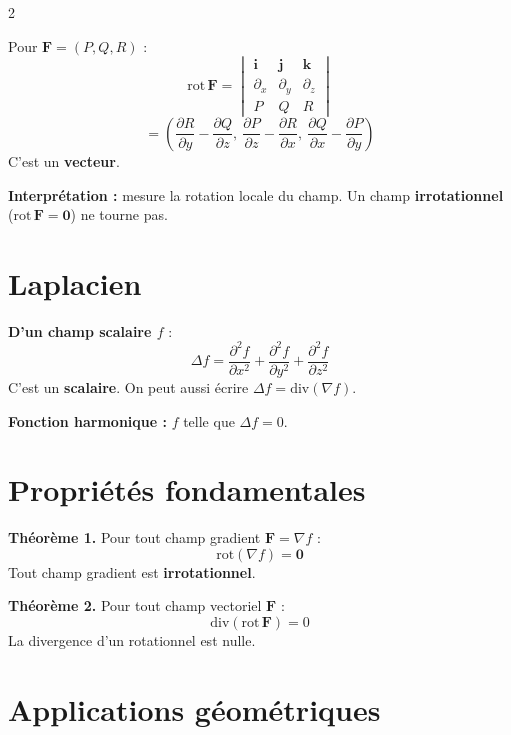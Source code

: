 \documentclass[10pt,a4paper]{article}
\begin{document}
\begin{multicols}{2}
\begin{grisbox}
Pour $\mathbf{F}=(P,Q,R)$ :
$$\boxed{\mathrm{rot}\,\mathbf{F} = \begin{vmatrix}\mathbf{i} & \mathbf{j} & \mathbf{k}\\\partial_x & \partial_y & \partial_z\\ P & Q & R\end{vmatrix}}$$
$$= \!\left(\frac{\partial R}{\partial y}-\frac{\partial Q}{\partial z},\ \frac{\partial P}{\partial z}-\frac{\partial R}{\partial x},\ \frac{\partial Q}{\partial x}-\frac{\partial P}{\partial y}\right)$$
C'est un \textbf{vecteur}.
\end{grisbox}

\textbf{Interprétation :} mesure la rotation locale du champ. Un champ \textbf{irrotationnel} ($\mathrm{rot}\,\mathbf{F}=\mathbf{0}$) ne tourne pas.

\section{Laplacien}

\begin{grisbox}
\textbf{D'un champ scalaire $f$} :
$$\boxed{\Delta f = \frac{\partial^2 f}{\partial x^2} + \frac{\partial^2 f}{\partial y^2} + \frac{\partial^2 f}{\partial z^2}}$$
C'est un \textbf{scalaire}. On peut aussi écrire $\Delta f = \mathrm{div}(\nabla f)$.

\textbf{Fonction harmonique :} $f$ telle que $\Delta f = 0$.
\end{grisbox}

\section{Propriétés fondamentales}

\begin{theobox}
\textbf{Théorème 1.} Pour tout champ gradient $\mathbf{F}=\nabla f$ :
$$\mathrm{rot}(\nabla f) = \mathbf{0}$$
Tout champ gradient est \textbf{irrotationnel}.

\vspace{3pt}
\textbf{Théorème 2.} Pour tout champ vectoriel $\mathbf{F}$ :
$$\mathrm{div}(\mathrm{rot}\,\mathbf{F}) = 0$$
La divergence d'un rotationnel est nulle.
\end{theobox}

\section{Applications géométriques}


\end{multicols}
\end{document}
